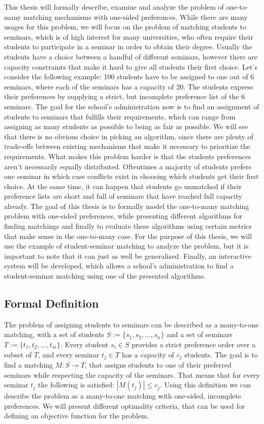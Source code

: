 This thesis will formally describe, examine and analyze the problem of one-to-many matching mechanisms with one-sided preferences. While there are many usages for this problem, we will focus on the problem of matching students to seminars, which is of high interest for many universities, who often require their students to participate in a seminar in order to obtain their degree. Usually the students have a choice between a handful of different seminars, however there are capacity constraints that make it hard to give all students their first choice. Let's consider the following example: 100 students have to be assigned to one out of 6 seminars, where each of the seminars has a capacity of 20. The students express their preferences by supplying a strict, but incomplete preference list of the 6 seminars. The goal for the school's administration now is to find an assignment of students to seminars that fulfills their requirements, which can range from assigning as many students as possible to being as fair as possible. We will see that there is no obvious choice in picking an algorithm, since there are plenty of trade-offs between existing mechanisms that make it necessary to prioritize the requirements.  
What makes this problem harder is that the students preferences aren't necessarily equally distributed. Oftentimes a majority of students prefers one seminar in which case conflicts exist in choosing which students get their first choice. At the same time, it can happen that students go unmatched if their preference lists are short and full of seminars that have reached full capacity already.
\newline
The goal of this thesis is to formally model the one-to-many matching problem with one-sided preferences, while presenting different algorithms for finding matchings and finally to evaluate these algorithms using certain metrics that make sense in the one-to-many case. For the purpose of this thesis, we will use the example of student-seminar matching to analyze the problem, but it is important to note that it can just as well be generalized. Finally, an interactive system will be developed, which allows a school's administration to find a student-seminar matching using one of the presented algorithms. 

\subsection{Formal Definition}
The problem of assigning students to seminars can be described as a many-to-one matching, with a set of students $S:= \{s_1, s_2, ...,s_n\}$ and a set of seminars $T:= \{t_1, t_2, ..., t_m\}$. Every student $s_i \in S$ provides a strict preference order over a subset of $T$, and every seminar $t_j \in T$ has a capacity of $c_j$ students. The goal is to find a matching $M: S \rightarrow T$, that assigns students to one of their preferred seminars while respecting the capacity of the seminars. That means that for every seminar $t_j$ the following is satisfied: $|M(t_j)| \leq c_j$. Using this definition we can describe the problem as a many-to-one matching with one-sided, incomplete preferences. We will present different optimality criteria, that can be used for defining an objective function for the problem.

